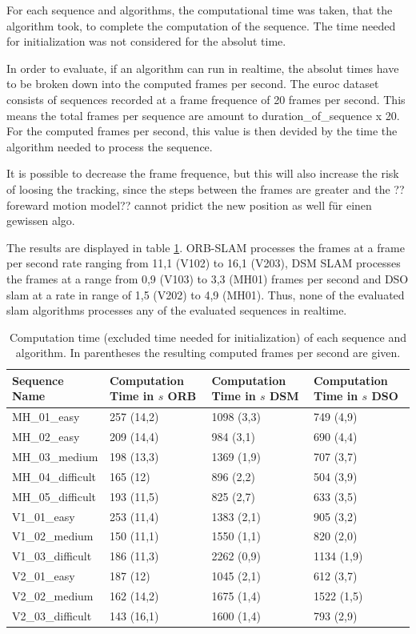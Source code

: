 	For each sequence and algorithms, the computational time was taken, that the algorithm took, to complete the computation of the sequence. 
	The time needed for initialization was not considered for the absolut time. 
	
	In order to evaluate, if an algorithm can run in realtime, the absolut times have to be broken down into the computed frames per second.
	The euroc dataset consists of sequences recorded at a frame frequence of 20 frames per second. This means the total frames per sequence 
	are amount to duration\_of\_sequence x 20. For the computed frames per second, this value is then devided by the time the algorithm needed 
	to process the sequence. 
	
	It is possible to decrease the frame 
	frequence, but this will also increase the risk of loosing the tracking, since the steps between the frames are greater and 
	the ??foreward motion model?? cannot pridict the new position as well für einen gewissen algo. %
	
	The results are displayed in table \ref{table:comp_time}. ORB-SLAM processes the frames at a frame per second rate ranging from 11,1 (V102) to 16,1 (V203), 
	DSM SLAM processes the frames at a range from 0,9 (V103) to 3,3 (MH01) frames per second and DSO slam at a rate in range of 1,5 (V202) to 4,9 (MH01). Thus, 
	none of the evaluated slam algorithms processes any of the evaluated sequences in realtime. 
	

	\begin{table}
	\caption{Computation time (excluded time needed for initialization) of each sequence and algorithm. In parentheses the 
	resulting computed frames per second are given.}
	\begin{tabular}{ |p{3cm}||p{3cm}|p{3cm}|p{3cm}|  }
	\hline
	Sequence Name & Computation Time in $s$ ORB & Computation Time in $s$ DSM & Computation Time in $s$ DSO \\
	\hline
	MH\_01\_easy & 257 (14,2) & 1098 (3,3) & 749 (4,9)\\
	MH\_02\_easy & 209 (14,4) & 984 (3,1) & 690 (4,4)\\
	MH\_03\_medium & 198 (13,3) & 1369 (1,9) & 707 (3,7)\\
	MH\_04\_difficult & 165 (12) & 896 (2,2) & 504 (3,9)\\
	MH\_05\_difficult & 193 (11,5) & 825 (2,7) & 633 (3,5)\\
	V1\_01\_easy & 253 (11,4) & 1383 (2,1) & 905 (3,2)\\
	V1\_02\_medium & 150 (11,1) & 1550 (1,1) & 820 (2,0)\\
	V1\_03\_difficult & 186 (11,3) & 2262 (0,9) & 1134 (1,9)\\
	V2\_01\_easy & 187 (12) & 1045 (2,1) & 612 (3,7)\\
	V2\_02\_medium & 162 (14,2) & 1675 (1,4) & 1522 (1,5)\\
	V2\_03\_difficult & 143 (16,1) & 1600 (1,4) & 793 (2,9)\\
	\hline
	\end{tabular}
	\label{table:comp_time}
	\end{table}

